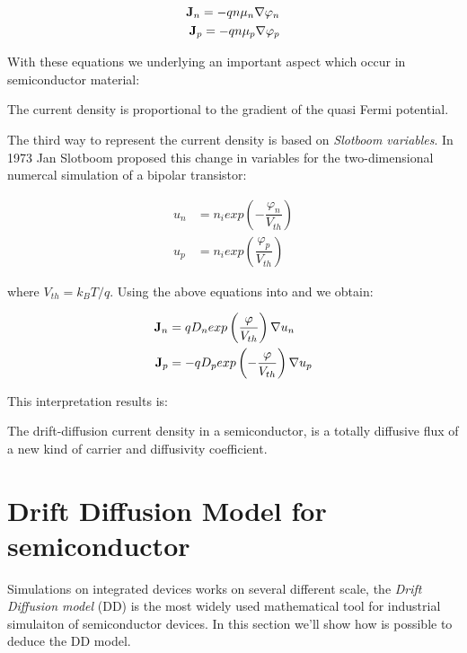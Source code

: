 \begin{align}
\mathbf{J}_n = -qn\mu_n\nabla \varphi_n \\
\mathbf{J}_p = -qn\mu_p\nabla \varphi_p 
\end{align}

With these equations we underlying an important aspect which occur in semiconductor material:
\begin{Osservazione}
The current density is proportional to the gradient of the quasi Fermi potential.
\end{Osservazione}

The third way to represent the current density is based on \textit{Slotboom variables}. In 1973 Jan Slotboom proposed this change in variables for the two-dimensional numercal simulation of a bipolar transistor:

\begin{align}
u_n &= n_iexp\left(-\dfrac{\varphi_n}{V_{th}} \right) \label{eq: un slotboom} \\
u_p &= n_iexp\left(\dfrac{\varphi_p}{V_{th}} \right) \label{eq: up slotboom} 
\end{align}

where $V_{th}=k_BT/q$. Using the above equations into  and  we obtain:

\begin{align}
\mathbf{J}_n &= qD_n exp\left(\dfrac{\varphi}{V_{th}}\right) \nabla u_n \label{eq: Jn slotboom} \\
\mathbf{J}_p &= -qD_p exp\left(-\dfrac{\varphi}{V_{th}}\right)  \nabla u_p 
\end{align}

This interpretation results is:
\begin{Osservazione}
The drift-diffusion current density in a semiconductor, is a totally diffusive flux of a new kind of carrier and diffusivity coefficient. 
\end{Osservazione}


\section{Drift Diffusion Model for semiconductor}
\label{section: dd model for semi}

Simulations on integrated devices works on several different scale, the \textit{Drift Diffusion model} (DD) is the most widely used mathematical tool for industrial simulaiton of semiconductor devices. In this section we'll show how is possible to deduce the DD model.

